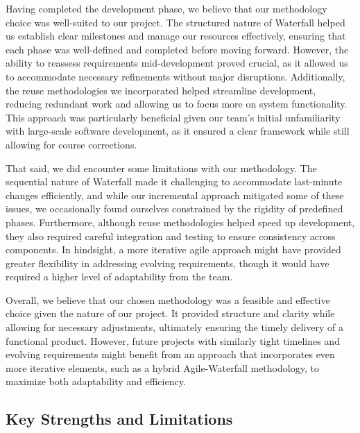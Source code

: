 \documentclass{article}
\begin{document}
    Having completed the development phase, we believe that our methodology choice was well-suited to our project. The structured nature of Waterfall helped us establish clear milestones and manage our resources effectively, 
    ensuring that each phase was well-defined and completed before moving forward. However, the ability to reassess requirements mid-development proved crucial, as it allowed us to accommodate necessary refinements without major 
    disruptions. Additionally, the reuse methodologies we incorporated helped streamline development, reducing redundant work and allowing us to focus more on system functionality. This approach was particularly beneficial given 
    our team’s initial unfamiliarity with large-scale software development, as it ensured a clear framework while still allowing for course corrections.

    That said, we did encounter some limitations with our methodology. The sequential nature of Waterfall made it challenging to accommodate last-minute changes efficiently, and while our incremental approach mitigated some of these 
    issues, we occasionally found ourselves constrained by the rigidity of predefined phases. Furthermore, although reuse methodologies helped speed up development, they also required careful integration and testing to ensure consistency 
    across components. In hindsight, a more iterative agile approach might have provided greater flexibility in addressing evolving requirements, though it would have required a higher level of adaptability from the team.

    Overall, we believe that our chosen methodology was a feasible and effective choice given the nature of our project. It provided structure and clarity while allowing for necessary adjustments, ultimately ensuring the timely 
    delivery of a functional product. However, future projects with similarly tight timelines and evolving requirements might benefit from an approach that incorporates even more iterative elements, such as a hybrid Agile-Waterfall 
    methodology, to maximize both adaptability and efficiency.

    \subsection{Key Strengths and Limitations}
\end{document}
